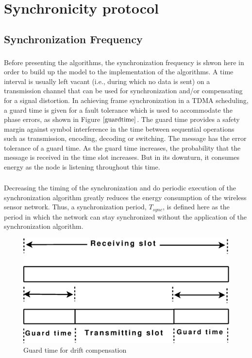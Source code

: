 \documentclass[a4paper,10pt]{report}
\begin{document}
\chapter{\textbf{Synchronicity protocol}}
\section{\textbf{Synchronization Frequency}}\paragraph*{}
Before presenting the algorithms, the synchronization frequency is shwon here in order to build up the model to the implementation of the algorithms. A time interval is usually left vacant (i.e., during which no data is sent) on a transmission channel that can be used for synchronization and/or compensating for a signal distortion. In achieving frame synchronization in a TDMA scheduling, a guard time is given for a fault tolerance which is used to accommodate the phase errors, as shown in Figure $\ref{guardtime}$. The guard time provides a safety margin against symbol interference in the time between sequential operations such as transmission, encoding, decoding or switching. The message has the error tolerance of a guard time. As the guard time increases, the probability that the message is received in the time slot increases. But in its downturn, it consumes energy as the node is listening throughout this time.
\paragraph*{} Decreasing the timing of the synchronization and do periodic execution of the synchronization algorithm greatly reduces
the energy consumption of the wireless sensor network. Thus, a synchronization period, $T_{sync}$, is defined here as the period in which the network can stay synchronized without the application of the synchronization algorithm.
\begin{figure}
\centering
\includegraphics[width=0.6 \textwidth]{guardtime}
\caption{Guard time for drift compensation} \label{guardtime}
\end{figure}
\end{document}
